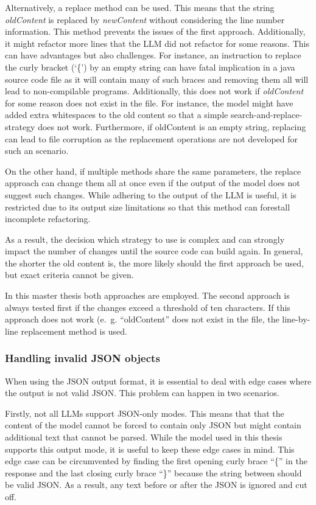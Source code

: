 Alternatively, a replace method can be used. This means that the string \textit{oldContent} is replaced by \textit{newContent} without considering the line number information. This method prevents the issues of the first approach. Additionally, it might refactor more lines that the \ac{LLM} did not refactor for some reasons. This can have advantages but also challenges. For instance, an instruction to replace the curly bracket (\enquote*{\{}) by an empty string can have fatal implication in a java source code file as it will contain many of such braces and removing them all will lead to non-compilable programs. Additionally, this does not work if \textit{oldContent} for some reason does not exist in the file. For instance, the model might have added extra whitespaces to the old content so that a simple search-and-replace-strategy does not work. Furthermore, if oldContent is an empty string, replacing can lead to file corruption as the replacement operations are not developed for such an scenario. 

On the other hand, if multiple methods share the same parameters, the replace approach can change them all at once even if the output of the model does not suggest such changes. While adhering to the output of the \ac{LLM} is useful, it is restricted due to its output size limitations so that this method can forestall incomplete refactoring. 

As a result, the decision which strategy to use is complex and can strongly impact the number of changes until the source code can build again. In general, the shorter the old content is, the more likely should the first approach be used, but exact criteria cannot be given. 


In this master thesis both approaches are employed. The second approach is always tested first if the changes exceed a threshold of ten characters. If this approach does not work (e.~g. \enquote{oldContent} does not exist in the file, the line-by-line replacement method is used.  

\subsubsection{Handling invalid \ac{JSON} objects}

When using the \ac{JSON} output format, it is essential to deal with edge cases where the output is not valid \ac{JSON}. This problem can happen in two scenarios.

Firstly, not all \acp{LLM} support \ac{JSON}-only modes. This means that that the content of the model cannot be forced to contain only \ac{JSON} but might contain additional text that cannot be parsed. While the model used in this thesis supports this output mode, it is useful to keep these edge cases in mind. This edge case can be circumvented by finding the first opening curly brace \enquote{\{} in the response and the last closing curly brace \enquote{\}} because the string between should be valid \ac{JSON}. As a result, any text before or after the \ac{JSON} is ignored and cut off. 


